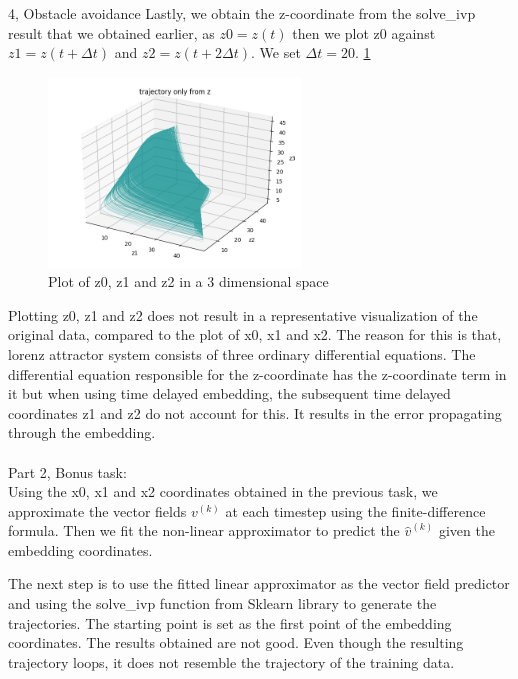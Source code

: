 \documentclass[10pt,a4paper]{article}
\begin{document}
\begin{task}{4, Obstacle avoidance}
Lastly, we obtain the z-coordinate from the solve\_ivp result that we obtained earlier, as $z0 = z(t)$ then we plot z0 against $z1 = z(t + \Delta t)$ and $z2 = z(t + 2\Delta t)$. We set $\Delta t = 20$. \ref{fig:task4_part2_3}

\begin{figure}[H]
\centering
\includegraphics[width=0.6\textwidth]{../plots/task4_part2_3.png}
\caption{Plot of z0, z1 and z2 in a 3 dimensional space}
\label{fig:task4_part2_3}
\end{figure}

Plotting z0, z1 and z2 does not result in a representative visualization of the original data, compared to the plot of x0, x1 and x2. The reason for this is that, lorenz attractor system consists of three ordinary differential equations. The differential equation responsible for the z-coordinate has the z-coordinate term in it but when using time delayed embedding, the subsequent time delayed coordinates z1 and z2 do not account for this. It results in the error propagating through the embedding. \\\\

Part 2, Bonus task: \\
Using the x0, x1 and x2 coordinates obtained in the previous task, we approximate the vector fields $v^{(k)}$ at each timestep using the finite-difference formula. Then we fit the non-linear approximator to predict the $\hat{v}^{(k)}$ given the embedding coordinates.

The next step is to use the fitted linear approximator as the vector field predictor and using the solve\_ivp function from Sklearn library to generate the trajectories. The starting point is set as the first point of the embedding coordinates. The results obtained are not good. Even though the resulting trajectory loops, it does not resemble the trajectory of the training data.


\end{task}
\end{document}
